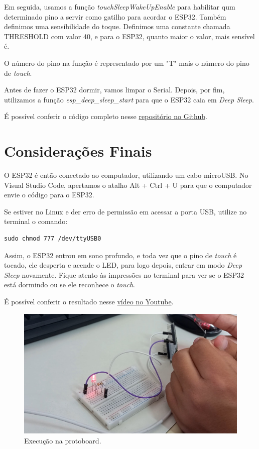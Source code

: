 \documentclass[12pt]{article}
\begin{document}


Em seguida, usamos a função \textit{touchSleepWakeUpEnable} para habilitar qum determinado pino a servir como gatilho para acordar o ESP32. Também definimos uma sensibilidade do toque. Definimos uma constante chamada THRESHOLD com valor 40, e para o ESP32, quanto maior o valor, mais sensível é.

O número do pino na função é representado por um "T" mais o número do pino de \textit{touch}.



Antes de fazer o ESP32 dormir, vamos limpar o Serial. Depois, por fim, utilizamos a função \textit{esp\_deep\_sleep\_start} para que o ESP32 caia em \textit{Deep Sleep}.



É possível conferir o código completo nesse \href{https://github.com/fabricio-araujo94/microcontroladores/tree/main/deep_sleep}{repositório no Github}.

\section{Considerações Finais}

O ESP32 é então conectado ao computador, utilizando um cabo microUSB. No Visual Studio Code, apertamos o atalho Alt + Ctrl + U para que o computador envie o código para o ESP32. 

Se estiver no Linux e der erro de permissão em acessar a porta USB, utilize no terminal o comando:

\begin{lstlisting}
sudo chmod 777 /dev/ttyUSB0
\end{lstlisting}

Assim, o ESP32 entrou em sono profundo, e toda vez que o pino de \textit{touch} é tocado, ele desperta e acende o LED, para logo depois, entrar em modo \textit{Deep Sleep} novamente. Fique atento às impressões no terminal para ver se o ESP32 está dormindo ou se ele reconhece o \textit{touch}.

É possível conferir o resultado nesse \href{https://youtu.be/uvPc8xBWX7k}{vídeo no Youtube}.

\begin{figure}[H]
    \centering
    \includegraphics[width=0.5\linewidth]{img/Execução_Protoboart.jpg}
    \caption{Execução na protoboard.}
    \label{fig:protoboard-final}
\end{figure}
\end{document}
